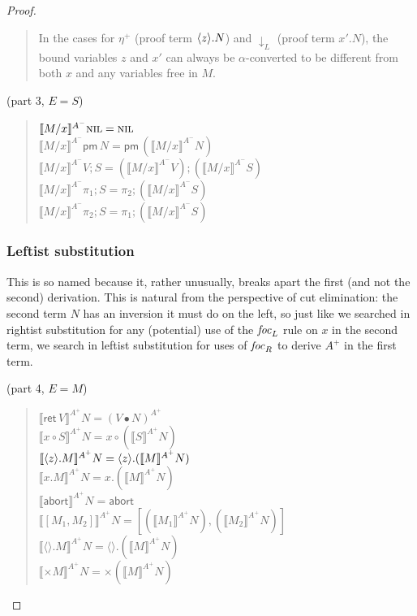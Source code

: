\documentclass[acmtocl]{robtrans}\pdfoutput=1
\newcommand{\llangle}{\llbracket}
\newcommand{\rrangle}{\rrbracket}
\newcommand{\dslt}[2]{{#1}.{#2}}      \newcommand{\usrt}[1]{\{{#1}\}}       \newcommand{\uslt}[1]{\mathsf{pm}\,{#1}}
\newcommand{\rft}[1]{\mathsf{ret}\,{#1}} \newcommand{\lft}[2]{{#1} \circ {#2}}
\begin{document}
\begin{proof}
\begin{quote}
\medskip
In the cases for $\eta^+$ (proof term $\langle{z}\rangle.{N}$) and ${\downarrow}_L$
(proof term $\dslt{x'}{N}$), the bound variables
$z$ and $x'$ can always be 
$\alpha$-converted to be different from both $x$ and any variables free in $M$.
\end{quote}

\medskip
{} (part 3, $E = S$)

\begin{quote}
$\llbracket M/x \rrbracket^{A^-} \textsc{nil} = \textsc{nil}$\\ 
$\llbracket M/x \rrbracket^{A^-} \uslt{N} 
   = \uslt{(\llbracket M/x \rrbracket^{A^-} N)}$\\
$\llbracket M/x \rrbracket^{A^-} V; S 
   = (\llbracket M/x \rrbracket^{A^-} V); 
     (\llbracket M/x \rrbracket^{A^-} S)$\\
$\llbracket M/x \rrbracket^{A^-} \pi_1; S 
   = \pi_2; (\llbracket M/x \rrbracket^{A^-} S)$\\
$\llbracket M/x \rrbracket^{A^-} \pi_2; S 
   = \pi_1; (\llbracket M/x \rrbracket^{A^-} S)$
\end{quote}

\subsubsection*{Leftist substitution} 
This is so named because it, rather unusually, breaks apart the first
(and not the second) derivation. This is natural from the perspective
of cut elimination: the second term $N$ has an inversion it must do on
the left, so just like we searched in rightist substitution for any
(potential) use of the ${\it foc}_L$ rule on $x$ in the second term, we
search in leftist substitution for uses of ${\it foc}_R$ to derive
$A^+$ in the first term.

\bigskip
\fbox{$\llangle M \rrangle^{A^+} N = M'$} (part 4, $E=M$)
\begin{quote}
$\llangle \rft{V} \rrangle^{A^+} N 
   = (V \bullet N)^{A^+}$\\
$\llangle \lft{x}{S} \rrangle^{A^+} N  
   = \lft{x}{(\llangle S \rrangle^{A^+} N)}$\\
$\llangle \etalt{z}{M} \rrangle^{A^+} N  
   = \etalt{z}{(\llangle M \rrangle^{A^+} N)}$\\
$\llangle \dslt{x}{M} \rrangle^{A^+} N  
   = \dslt{x}{(\llangle M \rrangle^{A^+} N)}$\\
$\llangle \mathsf{abort} \rrangle^{A^+} N = \mathsf{abort}$\\
$\llangle [M_1, M_2] \rrangle^{A^+} N  
   = [(\llangle M_1 \rrangle^{A^+} N), 
      (\llangle M_2 \rrangle^{A^+} N)]$\\
$\llangle \langle\rangle.M \rrangle^{A^+} N  
   = \langle\rangle.(\llangle M \rrangle^{A^+} N)$\\
$\llangle {\times}M \rrangle^{A^+} N  
   = {\times}(\llangle M \rrangle^{A^+} N)$
\end{quote}


\end{proof}
\end{document}
